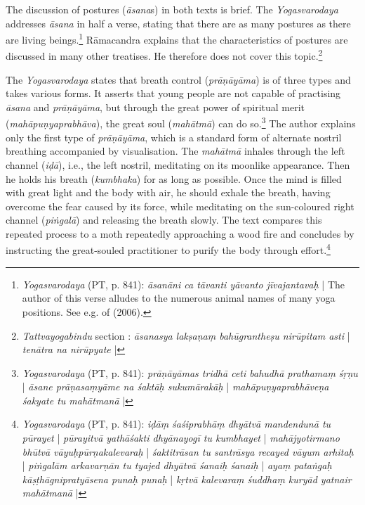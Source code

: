 The discussion of postures (\textit{āsana}s) in both texts is brief. The \emph{Yogasvarodaya} addresses \textit{āsana} in half a verse, stating that there are as many postures as there are living beings.\footnote{\textit{Yogasvarodaya} (PT, p. 841): \textit{āsanāni ca tāvanti yāvanto jīvajantavaḥ} | The author of this verse alludes to the numerous animal names of many yoga positions. See e.g.  of \citeauthor{encyclopediaasana} (2006).} Rāmacandra explains that the characteristics of postures are discussed in many other treatises. He therefore does not cover this topic.\footnote{\textit{Tattvayogabindu} section : \textit{āsanasya lakṣaṇaṃ bahūgrantheṣu nirūpitam asti} | \textit{tenātra na nirūpyate} |}

The \textit{Yogasvarodaya} states that breath control (\textit{prāṇāyāma}) is of three types and takes various forms. It asserts that young people are not capable of practising \textit{āsana} and \textit{prāṇāyāma}, but through the great power of spiritual merit (\textit{mahāpuṇyaprabhāva}), the great soul (\textit{mahātmā}) can do so.\footnote{\textit{Yogasvarodaya} (PT, p. 841): \textit{prāṇāyāmas tridhā ceti bahudhā prathamaṃ śṛṇu} | \textit{āsane prāṇasaṃyāme na śaktāḥ sukumārakāḥ} | \textit{mahāpuṇyaprabhāveṇa śakyate tu mahātmanā} |} The author explains only the first type of \textit{prāṇāyāma}, which is a standard form of alternate nostril breathing accompanied by visualisation. The \textit{mahātmā} inhales through the left channel (\textit{iḍā}), i.e., the left nostril, meditating on its moonlike appearance. Then he holds his breath (\textit{kumbhaka}) for as long as possible. Once the mind is filled with great light and the body with air, he should exhale the breath, having overcome the fear caused by its force, while meditating on the sun-coloured right channel (\textit{piṅgalā}) and releasing the breath slowly. The text compares this repeated process to a moth repeatedly approaching a wood fire and concludes by instructing the great-souled practitioner to purify the body through effort.\footnote{\textit{Yogasvarodaya} (PT, p. 841): \textit{iḍāṃ śaśiprabhāṃ dhyātvā mandendunā tu pūrayet} | \textit{pūrayitvā yathāśakti dhyānayogī tu kumbhayet} | \textit{mahājyotirmano bhūtvā vāyuḥpūrṇakalevaraḥ} | \textit{śaktitrāsan tu santrāsya recayed vāyum arhitaḥ} | \textit{piṅgalām arkavarṇān tu tyajed dhyātvā śanaiḥ śanaiḥ} | \textit{ayaṃ pataṅgaḥ kāṣṭhāgnipratyāsena punaḥ punaḥ} | \textit{kṛtvā kalevaraṃ śuddhaṃ kuryād yatnair mahātmanā} |}

